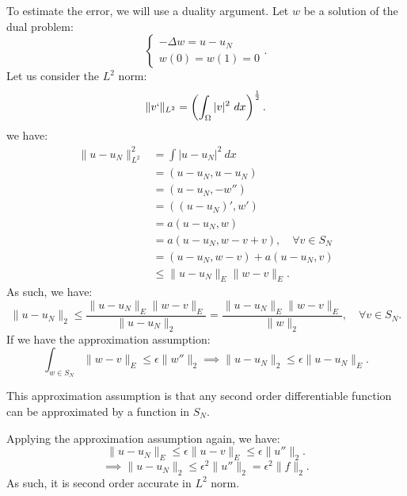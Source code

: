 \documentclass[../main/main.tex]{subfiles}
\begin{document}
To estimate the error, we will use a duality argument. Let $w$ be a solution of the dual problem:  \[
\begin{cases}
    -\Delta w = u-u_N\\
    w(0) = w(1) = 0
\end{cases}
.\] Let us consider the $L^2$ norm: \[
\|v`\|_{L^2} = \left( \int_\Omega |v|^2~dx \right) ^\frac{1}{2}
.\]we have:
\begin{align*} 
    \|u-u_N\|^2_{L^2} &= \int |u-u_N|^2 ~dx \\
                      &= (u-u_N,u-u_N)\\
                      &= (u-u_N, -w'') \\
                      &= ((u-u_N)',w') \\
                      &= a(u-u_N,w) \\
                      &= a(u-u_N,w-v+v),\quad\forall v \in  S_N \\
                      &= (u-u_N,w-v) + a(u-u_N,v) \\
                      &\le \|u-u_N\|_E \|w-v\|_E 
.\end{align*}
As such, we have: \[
\|u-u_N\|_{2} \le  \frac{\|u-u_N\|_E \|w-v\|_E}{\|u-u_N\|_2} = \frac{\|u-u_N\|_E \|w-v\|_E}{\|w\|_2}, \quad \forall  v \in S_N 
.\] If we have the approximation assumption: \[
\int_{w \in  S_N} \|w-v\|_E \le  \epsilon \|w''\|_2 \implies \|u-u_N\|_2 \le \epsilon \|u-u_N\|_E 
.\] 
\begin{remark}
    This approximation assumption is that any second order differentiable function can be approximated by a function in $S_N$. 
\end{remark}
Applying the approximation assumption again, we have: \[
\|u-u_N\|_E \le  \epsilon \|u-v\|_E \le  \epsilon \|u''\|_2
.\] \[
\implies \|u-u_N\|_2 \le  \epsilon^2  \|u''\|_2 = \epsilon^2\|f\|_2
.\] As such, it is second order accurate in $ L^2$ norm.\\
\end{document}

